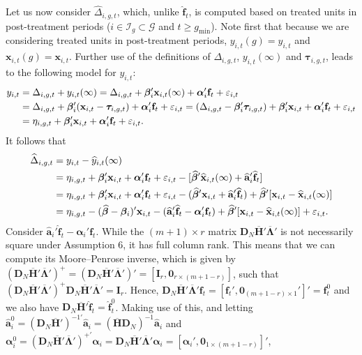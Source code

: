 \documentclass[12pt,fleqn]{article}
\def\*#1{\mathbf{#1}}
\def\+#1{\boldsymbol{#1}}
\begin{document}
Let us now consider $\widehat \Delta_{i,g,t}$, which, unlike $\widehat{\*f}_t$, is computed based on treated units in post-treatment periods ($i\in \mathcal{I}_g \subset \mathcal{G}$ and $t \geq g_{\min}$). Note first that because we are considering treated units in post-treatment periods, $y_{i,t}(g) = y_{i,t}$ and $\*x_{i,t}(g) = \*x_{i,t}$. Further use of the definitions of $\Delta_{i,g,t}$, $y_{i,t}(\infty)$ and $\+\tau_{i,g,t}$, leads to the following model for $y_{i,t}$:
\begin{align}
y_{i,t} &= \Delta_{i,g,t} + y_{i,t}(\infty)  = \Delta_{i,g,t} + \+\beta_i'\*x_{i,t}(\infty) +  \+\alpha_i'\*f_t + \varepsilon_{i,t}\notag\\
& = \Delta_{i,g,t} + \+\beta_i'(\*x_{i,t}-\+\tau_{i,g,t}) +  \+\alpha_i'\*f_t + \varepsilon_{i,t} = (\Delta_{i,g,t} - \+\beta_i'\+\tau_{i,g,t}) + \+\beta_i'\*x_{i,t} + \+\alpha_i'\*f_t + \varepsilon_{i,t} \notag\\
&  = \eta_{i,g,t} + \+\beta_i'\*x_{i,t} + \+\alpha_i'\*f_t + \varepsilon_{i,t}.
\end{align}
It follows that
\begin{align}
\widehat \Delta_{i,g,t} & = y_{i,t} - \widehat y_{i,t}(\infty) \notag\\
& = \eta_{i,g,t} + \+\beta_i'\*x_{i,t} + \+\alpha_i'\*f_t + \varepsilon_{i,t} - [\widehat{\+\beta}'\widehat{\*x}_{i,t}(\infty) + \widehat{\*a}_i'\widehat{\*f}_t]  \notag\\
& = \eta_{i,g,t} + \+\beta_i'\*x_{i,t} + \+\alpha_i'\*f_t + \varepsilon_{i,t} - (\widehat{\+\beta}'\*x_{i,t} + \widehat{\*a}_i'\widehat{\*f}_t) + \widehat{\+\beta}'[\*x_{i,t} - \widehat{\*x}_{i,t}(\infty)]  \notag\\
& = \eta_{i,g,t} - (\widehat{\+\beta} - \+\beta_i)'\*x_{i,t} - (\widehat{\*a}_i'\widehat{\*f}_t - \+\alpha_i'\*f_t)  + \widehat{\+\beta}'[\*x_{i,t} - \widehat{\*x}_{i,t}(\infty)] + \varepsilon_{i,t} .
\end{align}
Consider $\widehat{\*a}_i'\widehat{\*f}_t - \+\alpha_i'\*f_t$. While the $(m+1)\times r$ matrix $\mathbf{D}_N\overline{\mathbf{H}}'\overline{\boldsymbol{\Lambda}}'$ is not necessarily square under Assumption 6, it has full column rank. This means that we can compute its Moore--Penrose inverse, which is given by $(\mathbf{D}_N\overline{\mathbf{H}}'\overline{\boldsymbol{\Lambda}}')^+ = (\mathbf{D}_N\overline{\mathbf{H}}'\overline{\boldsymbol{\Lambda}}')' = [ \mathbf{I}_r, \mathbf{0}_{r\times (m+1-r)} ]$, such that $(\mathbf{D}_N\overline{\mathbf{H}}'\overline{\boldsymbol{\Lambda}}')^+ \mathbf{D}_N\overline{\mathbf{H}}'\overline{\boldsymbol{\Lambda}}' = \mathbf{I}_r$. Hence, $\mathbf{D}_N\overline{\mathbf{H}}'\overline{\boldsymbol{\Lambda}}'\*f_t = [\*f_t', \mathbf{0}_{(m+1-r)\times 1}']' = \*f_t^0$ and we also have $\*{D}_N\overline{\*{H}}'\widehat{\*{f}}_t=\widehat{\*{f}}^0_t$. Making use of this, and letting $\widehat{\*a}_i^0 = (\*{D}_N\overline{\*{H}}')^{-1\prime}\widehat{\*a}_i= (\overline{\*{H}}\*{D}_N)^{-1}\widehat{\*a}_i$ and $\+\alpha_i^0 = (\mathbf{D}_N\overline{\mathbf{H}}'\overline{\boldsymbol{\Lambda}}')^{+\prime} \+\alpha_i= \mathbf{D}_N\overline{\mathbf{H}}'\overline{\boldsymbol{\Lambda}}'\+\alpha_i = [ \+\alpha_i ', \mathbf{0}_{1\times (m+1-r)} ]'$,
\end{document}
